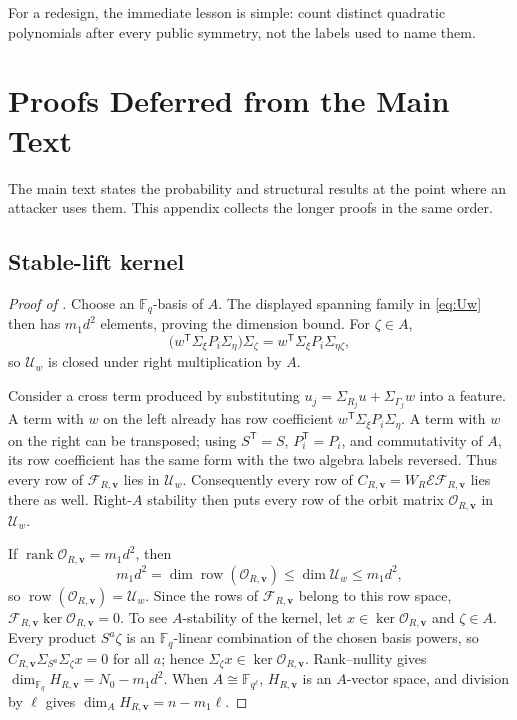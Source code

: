 \documentclass[11pt]{article}
\newcommand{\F}{\mathbb F}
\newcommand{\rank}{\operatorname{rank}}
\newcommand{\transpose}{\mathsf T}
\begin{document}
For a redesign, the immediate lesson is simple: count distinct quadratic
polynomials after every public symmetry, not the labels used to name them.

\appendix
\setcounter{section}{0}
\renewcommand{\thesection}{\Alph{section}}
\renewcommand{\theHsection}{app.\Alph{section}}


\section{Proofs Deferred from the Main Text}\label{app:deferred-proofs}

The main text states the probability and structural results at the point where
an attacker uses them.  This appendix collects the longer proofs in the same
order.

\subsection{Stable-lift kernel}\label{app:proof-stable-kernel}

\begin{proof}[Proof of ]
Choose an $\F_q$-basis of $A$.  The displayed spanning family in
\eqref{eq:Uw} then has $m_1d^2$ elements, proving the dimension bound.  For
$\zeta\in A$,
\[
 \bigl(w^\transpose\Sigma_\xi P_i\Sigma_\eta\bigr)\Sigma_\zeta
 =w^\transpose\Sigma_\xi P_i\Sigma_{\eta\zeta},
\]
so $\mathcal U_w$ is closed under right multiplication by $A$.

Consider a cross term produced by substituting
$u_j=\Sigma_{R_j}u+\Sigma_{\Gamma_j}w$ into a feature.  A term with $w$ on the left
already has row coefficient
$w^\transpose\Sigma_\xi P_i\Sigma_\eta$.  A term with $w$ on the right can be
transposed; using $S^\transpose=S$, $P_i^\transpose=P_i$, and commutativity of
$A$, its row coefficient has the same form with the two algebra labels
reversed.  Thus every row of $\mathcal F_{R,\mathbf v}$ lies in $\mathcal U_w$.
Consequently every row of
$C_{R,\mathbf v}=W_R\mathcal E\mathcal F_{R,\mathbf v}$ lies there as well.  Right-$A$
stability then puts every row of the orbit matrix $\mathcal O_{R,\mathbf v}$ in
$\mathcal U_w$.

If $\rank\mathcal O_{R,\mathbf v}=m_1d^2$, then
\[
 m_1d^2=\dim\operatorname{row}(\mathcal O_{R,\mathbf v})
 \le\dim\mathcal U_w\le m_1d^2,
\]
so $\operatorname{row}(\mathcal O_{R,\mathbf v})=\mathcal U_w$.  Since the rows of
$\mathcal F_{R,\mathbf v}$ belong to this row space,
$\mathcal F_{R,\mathbf v}\ker\mathcal O_{R,\mathbf v}=0$.  To see $A$-stability of the
kernel, let $x\in\ker\mathcal O_{R,\mathbf v}$ and $\zeta\in A$.  Every product
$S^a\zeta$ is an $\F_q$-linear combination of the chosen basis powers, so
$C_{R,\mathbf v}\Sigma_{S^a}\Sigma_\zeta x=0$ for all $a$; hence
$\Sigma_\zeta x\in\ker\mathcal O_{R,\mathbf v}$.  Rank--nullity gives
$\dim_{\F_q}H_{R,\mathbf v}=N_0-m_1d^2$.  When $A\cong\F_{q^\ell}$, $H_{R,\mathbf v}$ is an
$A$-vector space, and division by $\ell$ gives
$\dim_A H_{R,\mathbf v}=n-m_1\ell$.
\end{proof}
\end{document}
